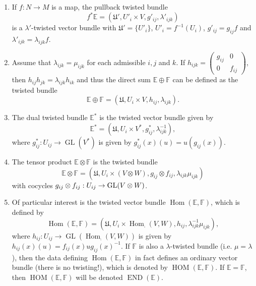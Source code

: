 \begin{enumerate}
\item If $f:N\to M$ is a map, the pullback twisted bundle
\begin{equation}\label{tvb_pullback}
f^*\mathbb{E}=(\mathfrak{U}',U'_i\times V,g'_{ij},\lambda'_{ijk})
\end{equation}
is a $\lambda'$-twisted vector bundle with $\mathfrak{U}'=\{U'_i\}$, $U'_i=f^{-1}(U_i)$, $g'_{ij}=g_{ij}f$ and $\lambda'_{ijk}=\lambda_{ijk}f$.

\item Assume that $\lambda_{ijk}=\mu_{ijk}$ for each admissible $i,j$ and $k$. If $h_{ijk}=\begin{pmatrix} g_{ij} & 0 \\ 0 & f_{ij} \end{pmatrix}$, then $h_{ij}h_{jk}=\lambda_{ijk}h_{ik}$ and thus the direct sum $\mathbb{E}\oplus \mathbb{F}$ can be defined as the twisted bundle
$$\mathbb{E}\oplus \mathbb{F}=(\mathfrak{U},U_i\times V,h_{ij},\lambda_{ijk}).$$

\item The dual twisted bundle $\mathbb{E}^*$ is the twisted vector bundle given by
$$\mathbb{E}^*=(\mathfrak{U},U_i\times V^*,g^*_{ij},\lambda_{ijk}^{-1}),$$
where $g^*_{ij}:U_{ij}\to \operatorname{GL}(V^*)$ is given by $g^*_{ij}(x)(u)=u(g_{ij}(x))$.

\item The tensor product $\mathbb{E}\otimes \mathbb{F}$ is the twisted bundle
$$\mathbb{E}\otimes \mathbb{F}=(\mathfrak{U},U_i\times (V\otimes W),g_{ij}\otimes f_{ij},\lambda_{ijk}\mu_{ijk})$$
with cocycles $g_{ij}\otimes f_{ij}:U_{ij}\to \operatorname{GL}(V\otimes W)$.

\item Of particular interest is the twisted vector bundle $\operatorname{Hom}(\mathbb{E},\mathbb{F})$, which is defined by
$$\operatorname{Hom}(\mathbb{E},\mathbb{F})=(\mathfrak{U},U_i\times \operatorname{Hom}_\comp (V,W),h_{ij},\lambda_{ijk}^{-1}\mu_{ijk}),$$
where $h_{ij}:U_{ij}\to \operatorname{GL}(\operatorname{Hom}_{\comp }(V,W))$ is given by $h_{ij}(x)(u)=f_{ij}(x)ug_{ij}(x)^{-1}$. If $\mathbb{F}$ is also a $\lambda$-twisted bundle (i.e. $\mu =\lambda$), then the data defining $\operatorname{Hom}(\mathbb{E},\mathbb{F})$ in fact defines an ordinary vector bundle (there is no twisting!), which is denoted by $\operatorname{HOM}(\mathbb{E},\mathbb{F})$. If $\mathbb{E}=\mathbb{F}$, then $\operatorname{HOM}(\mathbb{E},\mathbb{F})$ will be denoted $\operatorname{END}(\mathbb{E})$.
\end{enumerate}

